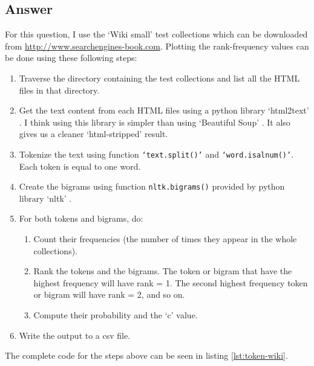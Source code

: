 \documentclass[letterpaper,11pt]{article}
\begin{document}
\subsection*{Answer}
For this question, I use the `Wiki small' test collections which can be downloaded from \url{http://www.searchengines-book.com}. Plotting the rank-frequency values can be done using these following steps:
\begin{enumerate}
\item Traverse the directory containing the test collections and list all the HTML files in that directory. 
\item Get the text content from each HTML files using a python library `html2text' \cite{html2text}. I think using this library is simpler than using `Beautiful Soup' \cite{bs4}. It also gives us a cleaner `html-stripped' result. 
\item Tokenize the text using function \texttt{`text.split()'} and  \texttt{`word.isalnum()'}. Each token is equal to one word. 
\item Create the bigrams using function \texttt{nltk.bigrams()} provided by python library `nltk' \cite{nltk}.
\item For both tokens and bigrams, do:
	\begin{enumerate}
	\item Count their frequencies (the number of times they appear in the whole collections). 
	\item Rank the tokens and the bigrams. The token or bigram that have the highest frequency will have rank = 1. The second highest frequency token or bigram will have rank = 2, and so on. 
	\item Compute their probability and the `c' value. 
	\end{enumerate}
\item Write the output to a csv file. 
\end{enumerate}

The complete code for the steps above can be seen in listing \ref{lst:token-wiki}. 
\end{document}
